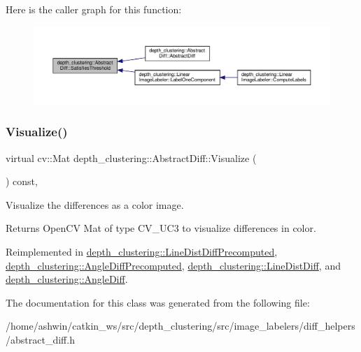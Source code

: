 Here is the caller graph for this function\+:\nopagebreak
\begin{figure}[H]
\begin{center}
\leavevmode
\includegraphics[width=350pt]{classdepth__clustering_1_1AbstractDiff_a940280569ed86d8f7e95626b1a2312d7_icgraph}
\end{center}
\end{figure}
\mbox{\label{classdepth__clustering_1_1AbstractDiff_a45314bf711f35e53590af28bdfc45313}} 
\subsubsection{\texorpdfstring{Visualize()}{Visualize()}}
{\footnotesize\ttfamily virtual cv\+::\+Mat depth\+\_\+clustering\+::\+Abstract\+Diff\+::\+Visualize (\begin{DoxyParamCaption}{ }\end{DoxyParamCaption}) const\hspace{0.3cm}{\ttfamily [inline]}, {\ttfamily [virtual]}}



Visualize the differences as a color image. 

\begin{DoxyReturn}{Returns}
Open\+CV Mat of type C\+V\+\_\+U\+C3 to visualize differences in color. 
\end{DoxyReturn}


Reimplemented in \hyperlink{classdepth__clustering_1_1LineDistDiffPrecomputed_a77c9cf3bea954f13cd2fef4f8a182425}{depth\+\_\+clustering\+::\+Line\+Dist\+Diff\+Precomputed}, \hyperlink{classdepth__clustering_1_1AngleDiffPrecomputed_a2fd85404d06843af0ee5c713017f6641}{depth\+\_\+clustering\+::\+Angle\+Diff\+Precomputed}, \hyperlink{classdepth__clustering_1_1LineDistDiff_a7feaf820589ccfb47786d5124a74d725}{depth\+\_\+clustering\+::\+Line\+Dist\+Diff}, and \hyperlink{classdepth__clustering_1_1AngleDiff_a462e4aadd35ca06e9b061d08c9787074}{depth\+\_\+clustering\+::\+Angle\+Diff}.



The documentation for this class was generated from the following file\+:\begin{DoxyCompactItemize}
\item 
/home/ashwin/catkin\+\_\+ws/src/depth\+\_\+clustering/src/image\+\_\+labelers/diff\+\_\+helpers/abstract\+\_\+diff.\+h\end{DoxyCompactItemize}
